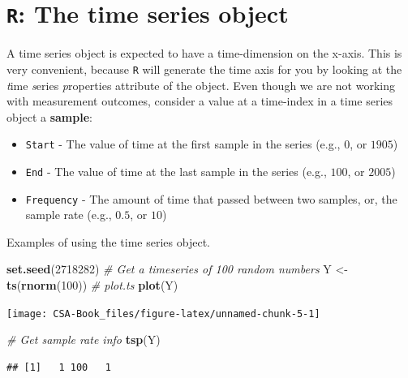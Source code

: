\documentclass[12pt,]{book}
\newenvironment{Shaded}{\begin{snugshade}}{\end{snugshade}}
\newcommand{\CommentTok}[1]{\textcolor[rgb]{0.56,0.35,0.01}{\textit{#1}}}
\newcommand{\DecValTok}[1]{\textcolor[rgb]{0.00,0.00,0.81}{#1}}
\newcommand{\KeywordTok}[1]{\textcolor[rgb]{0.13,0.29,0.53}{\textbf{#1}}}
\newcommand{\NormalTok}[1]{#1}
\newcommand{\StringTok}[1]{\textcolor[rgb]{0.31,0.60,0.02}{#1}}
\providecommand{\tightlist}{%
  \setlength{\itemsep}{0pt}\setlength{\parskip}{0pt}}
\let\stdsection\section
\renewcommand\section{\newpage\stdsection}
\begin{document}
\hypertarget{plotTS}{%
\section{\texorpdfstring{\textbf{\texttt{R}: The time series object}}{R: The time series object}}\label{plotTS}}

A time series object is expected to have a time-dimension on the x-axis. This is very convenient, because \texttt{R} will generate the time axis for you by looking at the \emph{t}ime \emph{s}eries \emph{p}roperties attribute of the object. Even though we are not working with measurement outcomes, consider a value at a time-index in a time series object a \textbf{sample}:

\begin{itemize}
\tightlist
\item
  \texttt{Start} - The value of time at the first sample in the series (e.g., \(0\), or \(1905\))
\item
  \texttt{End} - The value of time at the last sample in the series (e.g., \(100\), or \(2005\))
\item
  \texttt{Frequency} - The amount of time that passed between two samples, or, the sample rate (e.g., \(0.5\), or \(10\))
\end{itemize}

Examples of using the time series object.

\begin{Shaded}
\begin{Highlighting}[]
\KeywordTok{set.seed}\NormalTok{(}\DecValTok{2718282}\NormalTok{)}
\CommentTok{# Get a timeseries of 100 random numbers }
\NormalTok{Y <-}\StringTok{ }\KeywordTok{ts}\NormalTok{(}\KeywordTok{rnorm}\NormalTok{(}\DecValTok{100}\NormalTok{))}
\CommentTok{# plot.ts}
\KeywordTok{plot}\NormalTok{(Y)}
\end{Highlighting}
\end{Shaded}

\begin{center}\texttt{[image: CSA-Book\_files/figure-latex/unnamed-chunk-5-1]} \end{center}

\begin{Shaded}
\begin{Highlighting}[]
\CommentTok{# Get sample rate info}
\KeywordTok{tsp}\NormalTok{(Y)}
\end{Highlighting}
\end{Shaded}

\begin{verbatim}
## [1]   1 100   1
\end{verbatim}
\end{document}
